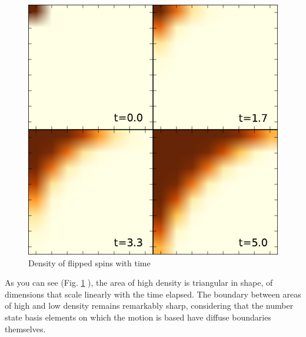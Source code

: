 \begin{figure}[ht]
  \begin{center}
  \includegraphics[scale =0.8] {assets/density_fig_all.pdf}
\end{center}


\caption{Density of flipped spins with time}
\label{densitypics}
\end{figure}

As you can see (Fig. \ref{densitypics} ), the area of high density is triangular in shape, of
dimensions that scale linearly with the time elapsed. The boundary
between areas of high and low density remains remarkably sharp,
considering that the number state basis elements on which the motion
is based have diffuse boundaries themselves.


